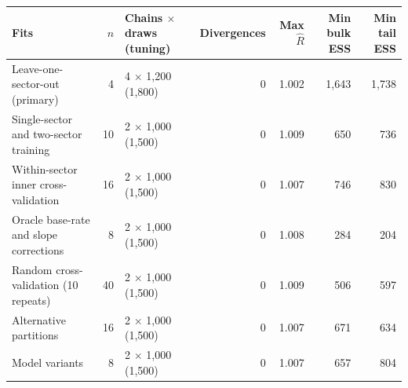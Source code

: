 \begin{tabular}{lrlrrrr}
\toprule
Fits & $n$ & Chains $\times$ draws (tuning) & Divergences & Max $\hat R$ & Min bulk ESS & Min tail ESS \\
\midrule
Leave-one-sector-out (primary) & 4 & 4 $\times$ 1,200 (1,800) & 0 & 1.002 & 1,643 & 1,738 \\
Single-sector and two-sector training & 10 & 2 $\times$ 1,000 (1,500) & 0 & 1.009 & 650 & 736 \\
Within-sector inner cross-validation & 16 & 2 $\times$ 1,000 (1,500) & 0 & 1.007 & 746 & 830 \\
Oracle base-rate and slope corrections & 8 & 2 $\times$ 1,000 (1,500) & 0 & 1.008 & 284 & 204 \\
Random cross-validation (10 repeats) & 40 & 2 $\times$ 1,000 (1,500) & 0 & 1.009 & 506 & 597 \\
Alternative partitions & 16 & 2 $\times$ 1,000 (1,500) & 0 & 1.007 & 671 & 634 \\
Model variants & 8 & 2 $\times$ 1,000 (1,500) & 0 & 1.007 & 657 & 804 \\
\bottomrule
\end{tabular}

